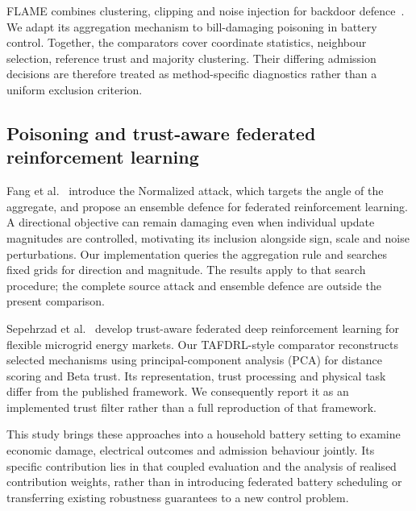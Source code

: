 FLAME combines clustering, clipping and noise injection for backdoor defence~\cite{flame}. We adapt its aggregation mechanism to bill-damaging poisoning in battery control. Together, the comparators cover coordinate statistics, neighbour selection, reference trust and majority clustering. Their differing admission decisions are therefore treated as method-specific diagnostics rather than a uniform exclusion criterion.

\subsection{Poisoning and trust-aware federated reinforcement learning}
Fang et al.~\cite{fang} introduce the Normalized attack, which targets the angle of the aggregate, and propose an ensemble defence for federated reinforcement learning. A directional objective can remain damaging even when individual update magnitudes are controlled, motivating its inclusion alongside sign, scale and noise perturbations. Our implementation queries the aggregation rule and searches fixed grids for direction and magnitude. The results apply to that search procedure; the complete source attack and ensemble defence are outside the present comparison.

Sepehrzad et al.~\cite{tafdrl} develop trust-aware federated deep reinforcement learning for flexible microgrid energy markets. Our TAFDRL-style comparator reconstructs selected mechanisms using principal-component analysis (PCA) for distance scoring and Beta trust. Its representation, trust processing and physical task differ from the published framework. We consequently report it as an implemented trust filter rather than a full reproduction of that framework.

This study brings these approaches into a household battery setting to examine economic damage, electrical outcomes and admission behaviour jointly. Its specific contribution lies in that coupled evaluation and the analysis of realised contribution weights, rather than in introducing federated battery scheduling or transferring existing robustness guarantees to a new control problem.
